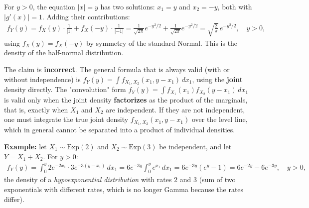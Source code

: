 \begin{solproblema}[prob:43a7344]
	For $y>0$, the equation $|x|=y$ has two solutions: $x_1=y$ and $x_2=-y$, both with $|g'(x)|=1$. Adding their contributions:
	\begin{align*}
		f_Y(y) = f_X(y)\cdot\frac{1}{|1|} + f_X(-y)\cdot\frac{1}{|-1|} = \frac{1}{\sqrt{2\pi}}e^{-y^2/2} + \frac{1}{\sqrt{2\pi}}e^{-y^2/2} = \sqrt{\frac{2}{\pi}}\,e^{-y^2/2}, \quad y>0,
	\end{align*}
	using $f_X(y)=f_X(-y)$ by symmetry of the standard Normal. This is the density of the half-normal distribution.
\end{solproblema}

\begin{solproblema}[prob:df21aa1]
	The claim is \textbf{incorrect}. The general formula that is always valid (with or without independence) is $f_Y(y) = \int f_{X_1,X_2}(x_1,y-x_1)\,dx_1$, using the \textbf{joint} density directly. The "convolution" form $f_Y(y)=\int f_{X_1}(x_1)f_{X_2}(y-x_1)\,dx_1$ is valid only when the joint density \textbf{factorizes} as the product of the marginals, that is, exactly when $X_1$ and $X_2$ are independent. If they are not independent, one must integrate the true joint density $f_{X_1,X_2}(x_1,y-x_1)$ over the level line, which in general cannot be separated into a product of individual densities.
\end{solproblema}

\begin{solproblema}[prob:db5d952]
	\textbf{Example:} let $X_1\sim\text{Exp}(2)$ and $X_2\sim\text{Exp}(3)$ be independent, and let $Y=X_1+X_2$. For $y>0$:
	\begin{align*}
		f_Y(y) = \int_0^y 2e^{-2x_1}\cdot 3e^{-3(y-x_1)}\,dx_1 = 6e^{-3y}\int_0^y e^{x_1}\,dx_1 = 6e^{-3y}(e^y-1) = 6e^{-2y}-6e^{-3y}, \quad y>0,
	\end{align*}
	the density of a \emph{hypoexponential distribution} with rates $2$ and $3$ (sum of two exponentials with different rates, which is no longer Gamma because the rates differ).
\end{solproblema}
